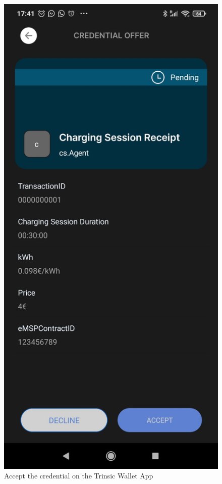 \begin{figure}[H]
\begin{minipage}{.33\textwidth}
\end{minipage}%
\begin{minipage}{.33\textwidth}
  \centering
  \includegraphics[width=.9\linewidth]{images/Frontend/Charging/14.1.jpeg}
  \caption[]{Accept the credential on the Trinsic Wallet App}
  \label{fig:charging_screenshot_14.1}
\end{minipage}
\end{figure}

